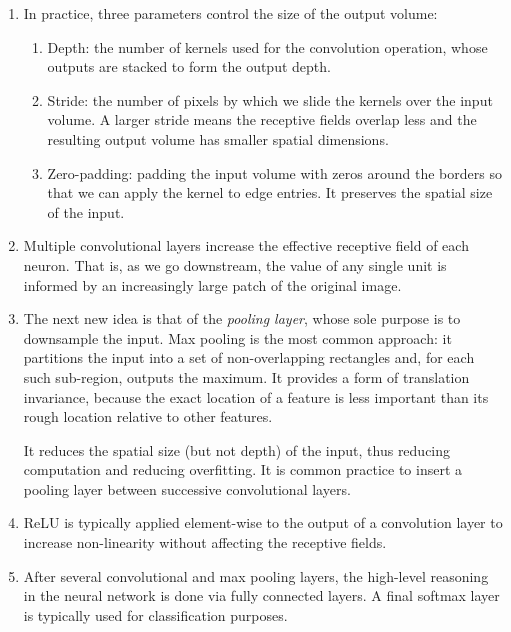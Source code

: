 \documentclass[10pt]{article}
\begin{document}
\begin{multicols}{2}
\begin{addmargin}[0.8em]{0.5em}
\begin{enumerate}[label=(\alph*)]
        \item In practice, three parameters control the size of the output volume:
        \begin{enumerate}[1.]
            \item Depth: the number of kernels used for the convolution operation, whose outputs are stacked to form the output depth.
            \item Stride: the number of pixels by which we slide the kernels over the input volume. A larger stride means the receptive fields overlap less and the resulting output volume has smaller spatial dimensions. 
            \item Zero-padding: padding the input volume with zeros around the borders so that we can apply the kernel to edge entries. It preserves the spatial size of the input.
        \end{enumerate}
        
        \item Multiple convolutional layers increase the effective receptive field of each neuron. That is, as we go downstream, the value of any single unit is informed by an increasingly large patch of the original image.
        
        \item The next new idea is that of the \textit{pooling layer}, whose sole purpose is to downsample the input. Max pooling is the most common approach: it partitions the input into a set of non-overlapping rectangles and, for each such sub-region, outputs the maximum. It provides a form of translation invariance, because the exact location of a feature is less important than its rough location relative to other features.
        
        It reduces the spatial size (but not depth) of the input, thus reducing computation and reducing overfitting. It is common practice to insert a pooling layer between successive convolutional layers.
        
        \item ReLU is typically applied element-wise to the output of a convolution layer to increase non-linearity without affecting the receptive fields.
        
        \item After several convolutional and max pooling layers, the high-level reasoning in the neural network is done via fully connected layers. A final softmax layer is typically used for classification purposes.
        

\end{enumerate}
\end{addmargin}
\end{multicols}
\end{document}
